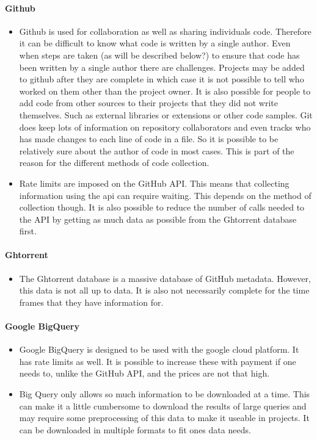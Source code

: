 \documentclass{article}
\begin{document}
\paragraph{Github}
\begin{itemize}
    \item Github is used for collaboration as well as sharing individuals code. Therefore it can be difficult to know what code is written by a single author. Even when steps are taken (as will be described below?) to ensure that code has been written by a single author there are challenges. Projects may be added to github after they are complete in which case it is not possible to tell who worked on them other than the project owner. It is also possible for people to add code from other sources to their projects that they did not write themselves. Such as external libraries or extensions or other code samples. Git does keep lots of information on repository collaborators and even tracks who has made changes to each line of code in a file. So it is possible to be relatively sure about the author of code in most cases. This is part of the reason for the different methods of code collection.

    \item Rate limits are imposed on the GitHub API. This means that collecting information using the api can require waiting. This depends on the method of collection though. It is also possible to reduce the number of calls needed to the API by getting as much data as possible from the Ghtorrent database first.
\end{itemize}

\paragraph{Ghtorrent}
\begin{itemize}
    \item The Ghtorrent database is a massive database of GitHub metadata. However, this data is not all up to data. It is also not necessarily complete for the time frames that they have information for.
\end{itemize}

\paragraph{Google BigQuery}
\begin{itemize}
    \item Google BigQuery is designed to be used with the google cloud platform. It has rate limits as well. It is possible to increase these with payment if one needs to, unlike the GitHub API, and the prices are not that high.

    \item Big Query only allows so much information to be downloaded at a time. This can make it a little cumbersome to download the results of large queries and may require some preprocessing of this data to make it useable in projects. It can be downloaded in multiple formats to fit ones data needs.
\end{itemize}
\end{document}
